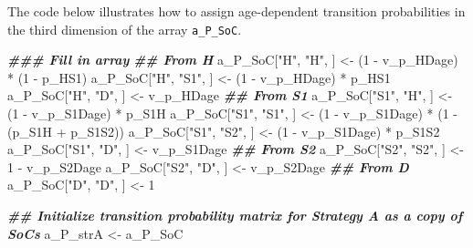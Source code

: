 \documentclass[
]{article}
\newenvironment{Shaded}{\begin{snugshade}}{\end{snugshade}}
\newcommand{\DecValTok}[1]{\textcolor[rgb]{0.00,0.00,0.81}{#1}}
\newcommand{\DocumentationTok}[1]{\textcolor[rgb]{0.56,0.35,0.01}{\textbf{\textit{#1}}}}
\newcommand{\NormalTok}[1]{#1}
\newcommand{\OtherTok}[1]{\textcolor[rgb]{0.56,0.35,0.01}{#1}}
\newcommand{\SpecialCharTok}[1]{\textcolor[rgb]{0.00,0.00,0.00}{#1}}
\newcommand{\StringTok}[1]{\textcolor[rgb]{0.31,0.60,0.02}{#1}}
\begin{document}
The code below illustrates how to assign age-dependent transition probabilities in the third dimension of the array \texttt{a\_P\_SoC}.

\begin{Shaded}
\begin{Highlighting}[]
\DocumentationTok{\#\#\# Fill in array}
\DocumentationTok{\#\# From H}
\NormalTok{a\_P\_SoC[}\StringTok{"H"}\NormalTok{, }\StringTok{"H"}\NormalTok{, ]   }\OtherTok{\textless{}{-}}\NormalTok{ (}\DecValTok{1} \SpecialCharTok{{-}}\NormalTok{ v\_p\_HDage) }\SpecialCharTok{*}\NormalTok{ (}\DecValTok{1} \SpecialCharTok{{-}}\NormalTok{ p\_HS1)}
\NormalTok{a\_P\_SoC[}\StringTok{"H"}\NormalTok{, }\StringTok{"S1"}\NormalTok{, ]  }\OtherTok{\textless{}{-}}\NormalTok{ (}\DecValTok{1} \SpecialCharTok{{-}}\NormalTok{ v\_p\_HDage) }\SpecialCharTok{*}\NormalTok{ p\_HS1}
\NormalTok{a\_P\_SoC[}\StringTok{"H"}\NormalTok{, }\StringTok{"D"}\NormalTok{, ]   }\OtherTok{\textless{}{-}}\NormalTok{ v\_p\_HDage}
\DocumentationTok{\#\# From S1}
\NormalTok{a\_P\_SoC[}\StringTok{"S1"}\NormalTok{, }\StringTok{"H"}\NormalTok{, ]  }\OtherTok{\textless{}{-}}\NormalTok{ (}\DecValTok{1} \SpecialCharTok{{-}}\NormalTok{ v\_p\_S1Dage) }\SpecialCharTok{*}\NormalTok{ p\_S1H}
\NormalTok{a\_P\_SoC[}\StringTok{"S1"}\NormalTok{, }\StringTok{"S1"}\NormalTok{, ] }\OtherTok{\textless{}{-}}\NormalTok{ (}\DecValTok{1} \SpecialCharTok{{-}}\NormalTok{ v\_p\_S1Dage) }\SpecialCharTok{*}\NormalTok{ (}\DecValTok{1} \SpecialCharTok{{-}}\NormalTok{ (p\_S1H }\SpecialCharTok{+}\NormalTok{ p\_S1S2))}
\NormalTok{a\_P\_SoC[}\StringTok{"S1"}\NormalTok{, }\StringTok{"S2"}\NormalTok{, ] }\OtherTok{\textless{}{-}}\NormalTok{ (}\DecValTok{1} \SpecialCharTok{{-}}\NormalTok{ v\_p\_S1Dage) }\SpecialCharTok{*}\NormalTok{ p\_S1S2}
\NormalTok{a\_P\_SoC[}\StringTok{"S1"}\NormalTok{, }\StringTok{"D"}\NormalTok{, ]  }\OtherTok{\textless{}{-}}\NormalTok{ v\_p\_S1Dage}
\DocumentationTok{\#\# From S2}
\NormalTok{a\_P\_SoC[}\StringTok{"S2"}\NormalTok{, }\StringTok{"S2"}\NormalTok{, ] }\OtherTok{\textless{}{-}} \DecValTok{1} \SpecialCharTok{{-}}\NormalTok{ v\_p\_S2Dage}
\NormalTok{a\_P\_SoC[}\StringTok{"S2"}\NormalTok{, }\StringTok{"D"}\NormalTok{, ]  }\OtherTok{\textless{}{-}}\NormalTok{ v\_p\_S2Dage}
\DocumentationTok{\#\# From D}
\NormalTok{a\_P\_SoC[}\StringTok{"D"}\NormalTok{, }\StringTok{"D"}\NormalTok{, ]   }\OtherTok{\textless{}{-}} \DecValTok{1}

\DocumentationTok{\#\# Initialize transition probability matrix for Strategy A as a copy of SoC\textquotesingle{}s}
\NormalTok{a\_P\_strA }\OtherTok{\textless{}{-}}\NormalTok{ a\_P\_SoC}
\end{Highlighting}
\end{Shaded}
\end{document}
